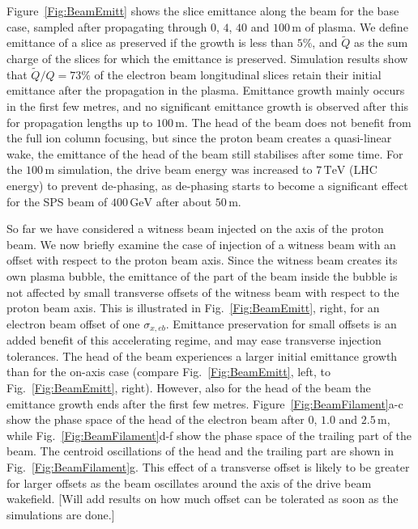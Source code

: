 \documentclass[aps,prstab,reprint,amsmath,amssymb,groupedaddress]{revtex4-1}
\newcommand{\unit}[1]{\,\mathrm{#1}}
\begin{document}
Figure~\ref{Fig:BeamEmitt} shows the slice emittance along the beam for the base case, sampled after propagating through
$0$, $4$, $40$ and $100\unit{m}$ of plasma. We define emittance of a slice as preserved if the growth is less than
$5\%$, and $\widetilde{Q}$ as the sum charge of the slices for which the emittance is preserved. Simulation results show
that $\widetilde{Q}/Q = 73\%$ of the electron beam longitudinal slices retain their initial emittance after the
propagation in the plasma. Emittance growth mainly occurs in the first few metres, and no significant emittance growth
is observed after this for propagation lengths up to $100\unit{m}$. The head of the beam does not benefit from the full
ion column focusing, but since the proton beam creates a quasi-linear wake, the emittance of the head of the beam still
stabilises after some time. For the $100\unit{m}$ simulation, the drive beam energy was increased to $7\unit{TeV}$ (LHC
energy) to prevent de-phasing, as de-phasing starts to become a significant effect for the SPS beam of $400\unit{GeV}$
after about $50\unit{m}$.

So far we have considered a witness beam injected on the axis of the proton beam. We now briefly examine the case of
injection of a witness beam with an offset with respect to the proton beam axis. Since the witness beam creates its own
plasma bubble, the emittance of the part of the beam inside the bubble is not affected by small transverse offsets of
the witness beam with respect to the proton beam axis. This is illustrated in Fig.~\ref{Fig:BeamEmitt}, right, for an
electron beam offset of one $\sigma_{x,eb}$. Emittance preservation for small offsets is an added benefit of this
accelerating regime, and may ease transverse injection tolerances. The head of the beam experiences a larger initial
emittance growth than for the on-axis case (compare Fig.~\ref{Fig:BeamEmitt}, left, to Fig.~\ref{Fig:BeamEmitt}, right).
However, also for the head of the beam the emittance growth ends after the first few metres.
Figure~\ref{Fig:BeamFilament}a-c show the phase space of the head of the electron beam after $0$, $1.0$ and
$2.5\unit{m}$, while Fig.~\ref{Fig:BeamFilament}d-f show the phase space of the trailing part of the beam. The
centroid oscillations of the head and the trailing part are shown in Fig.~\ref{Fig:BeamFilament}g. This effect of a
transverse offset is likely to be greater for larger offsets as the beam oscillates around the axis of the drive beam
wakefield. [Will add results on how much offset can be tolerated as soon as the simulations are done.]
\end{document}
